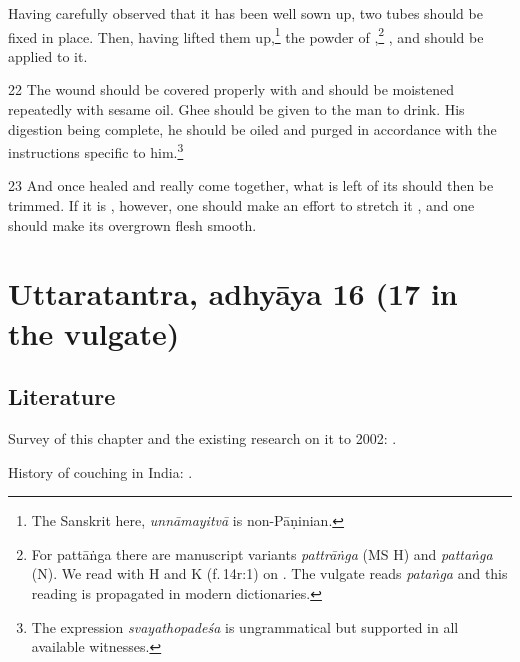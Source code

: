 \documentclass[12pt]{article}
\let\se\saneng  %
\begin{document}
\begin{translation}
        Having carefully observed that it has been well sown up,
        two tubes should be fixed in place.  Then, having lifted them up,\footnote{The 
        Sanskrit here, \emph{unnāmayitvā} is  non-Pāṇinian.}
        the powder of
        ,\footnote{For {pattāṅga} there are manuscript variants 
\emph{pattrāṅga} (MS H) and \emph{pattaṅga}    (N).  We read with H and K 
(f.\,14r:1) on \citet[1.14.36]{vulgate}. The vulgate reads \emph{pataṅga} 
and this reading is propagated in modern dictionaries.}
        ,
        and
        should be applied to it.
        
       \item[22] 
     The wound should be covered properly with  and should be
     moistened repeatedly with sesame oil.  Ghee should be given to the man to
     drink.  His digestion being complete, he should be oiled and purged in
     accordance with the instructions specific to him.\footnote{The expression 
     \emph{svayathopadeśa} is ungrammatical but supported in all available 
     witnesses.}   
     
     \item[23] %
And once healed and really come together, what is left of its \se{vadhra}{flesh}
should then be trimmed. If it is  \se{hīna}{reduced}, however, one should make an
effort to stretch it , and one should make its overgrown flesh smooth.
     
     
    \end{translation}    



\section{Uttaratantra, adhyāya 16 (17 in the vulgate)}


\subsection{Literature}

Survey of this chapter and the existing research 
on it to 2002: \cites[IA, 305--306]{meul-hist}.

History of couching in India: \cite{wujad-2019,
    desh-2000,
    desh-1999,
    bret-1826,
    leff-2020,
    shas-kaly,
    jack-1884,
    scot-1817,
    elli-1918,
    hend-1895}.
\end{document}
